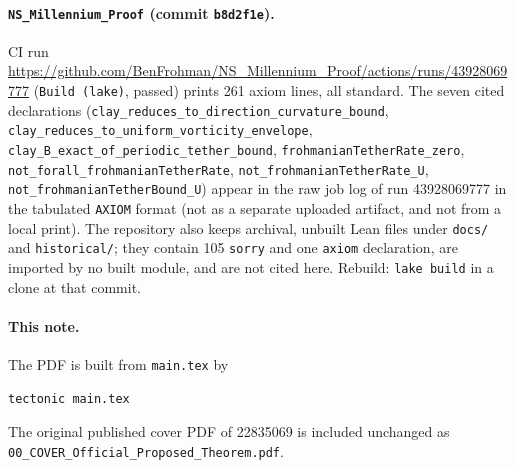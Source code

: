 \documentclass[11pt]{article}
\theoremstyle{plain}
\theoremstyle{definition}
\theoremstyle{remark}
\newcommand{\nssha}{b8d2f1e}
\begin{document}
\paragraph{\texttt{NS\_Millennium\_Proof} (commit \texttt{\nssha}).}
CI run \url{https://github.com/BenFrohman/NS\_Millennium\_Proof/actions/runs/43928069777} (\texttt{Build (lake)}, passed) prints 261 axiom lines, all standard. The seven cited declarations (\texttt{clay\_\hspace{0pt}reduces\_\hspace{0pt}to\_\hspace{0pt}direction\_\hspace{0pt}curvature\_\hspace{0pt}bound}, \texttt{clay\_\hspace{0pt}reduces\_\hspace{0pt}to\_\hspace{0pt}uniform\_\hspace{0pt}vorticity\_\hspace{0pt}envelope}, \texttt{clay\_\hspace{0pt}B\_\hspace{0pt}exact\_\hspace{0pt}of\_\hspace{0pt}periodic\_\hspace{0pt}tether\_\hspace{0pt}bound}, \texttt{frohmanianTetherRate\_\hspace{0pt}zero}, \texttt{not\_\hspace{0pt}forall\_\hspace{0pt}frohmanianTetherRate}, \texttt{not\_\hspace{0pt}frohmanianTetherRate\_\hspace{0pt}U}, \texttt{not\_\hspace{0pt}frohmanianTetherBound\_\hspace{0pt}U}) appear in the raw job log of run 43928069777 in the tabulated \texttt{AXIOM} format (not as a separate uploaded artifact, and not from a local print). The repository also keeps archival, unbuilt Lean files under \texttt{docs/} and \texttt{historical/}; they contain 105 \texttt{sorry} and one \texttt{axiom} declaration, are imported by no built module, and are not cited here. Rebuild: \texttt{lake build} in a clone at that commit.

\paragraph{This note.}
The PDF is built from \texttt{main.tex} by
\begin{lstlisting}
tectonic main.tex
\end{lstlisting}
The original published cover PDF of 22835069 is included unchanged as \texttt{00\_\hspace{0pt}COVER\_\hspace{0pt}Official\_\hspace{0pt}Proposed\_\hspace{0pt}Theorem.\hspace{0pt}pdf}.
\end{document}

